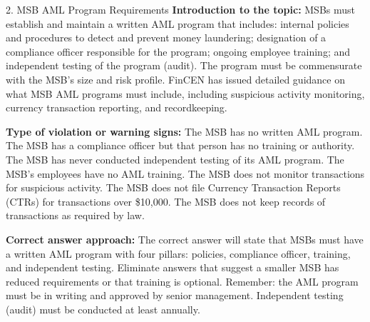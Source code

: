 \documentclass[11pt,a4paper]{beamer}
\begin{document}
\begin{frame}{2. MSB AML Program Requirements}
\tiny
\noindent\textbf{Introduction to the topic:} MSBs must establish and maintain a written AML program that includes: internal policies and procedures to detect and prevent money laundering; designation of a compliance officer responsible for the program; ongoing employee training; and independent testing of the program (audit). The program must be commensurate with the MSB's size and risk profile. FinCEN has issued detailed guidance on what MSB AML programs must include, including suspicious activity monitoring, currency transaction reporting, and recordkeeping.

\vspace{0.1cm}
\noindent\textbf{Type of violation or warning signs:} The MSB has no written AML program. The MSB has a compliance officer but that person has no training or authority. The MSB has never conducted independent testing of its AML program. The MSB's employees have no AML training. The MSB does not monitor transactions for suspicious activity. The MSB does not file Currency Transaction Reports (CTRs) for transactions over \$10,000. The MSB does not keep records of transactions as required by law.

\vspace{0.1cm}
\noindent\textbf{Correct answer approach:} The correct answer will state that MSBs must have a written AML program with four pillars: policies, compliance officer, training, and independent testing. Eliminate answers that suggest a smaller MSB has reduced requirements or that training is optional. Remember: the AML program must be in writing and approved by senior management. Independent testing (audit) must be conducted at least annually.
\end{frame}
\end{document}

